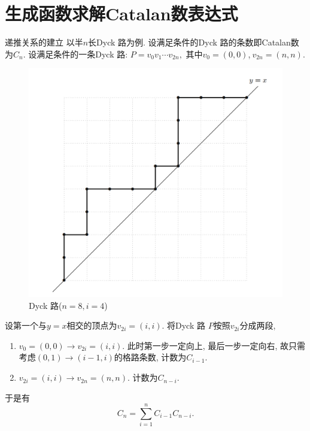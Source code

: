 \documentclass[punct]{beamer}
\begin{document}
\section{生成函数求解Catalan数表达式}
\begin{frame}{递推关系的建立}
    以半$n$长Dyck 路为例. 设满足条件的Dyck 路的条数即Catalan数为$C_{n}$. 设满足条件的一条Dyck 路: $P=v_{0}v_{1}\cdots v_{2n},$
    其中$v_{0}=(0,0)$,$\ v_{2n}=(n,n)$.

\begin{minipage}{0.4\linewidth}
    \begin{figure}[h]
        \centering
        \includegraphics[width=0.8\linewidth]{path-8.png}
        \caption{Dyck 路($n=8, i=4$)}
    \end{figure}
\end{minipage}
\begin{minipage}{0.55\linewidth}
    设\alert{第一个}与$y=x$相交的顶点为$v_{2i}=(i,i)$. 将Dyck 路 $P$按照$v_{2i}$分成两段,
    \begin{enumerate}
        \item $v_{0}=(0,0)\rightarrow v_{2i}=(i,i)$. 此时第一步一定向上, 最后一步一定向右, 故只需考虑$(0,1)\rightarrow (i-1,i)$的格路条数, 计数为$C_{i-1}$.
        \item $v_{2i}=(i,i)\rightarrow v_{2n}=(n,n)$. 计数为$C_{n-i}.$
   \end{enumerate}
\end{minipage}

    于是有
    \\[-20pt]
    \[
    C_{n}=\sum_{i=1}^n C_{i-1}C_{n-i}.\tag{1}
    \]
\end{frame}
\end{document}

